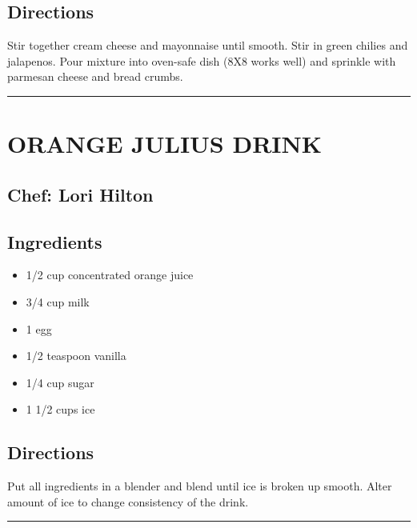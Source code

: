 \documentclass[
]{book}
\providecommand{\tightlist}{%
  \setlength{\itemsep}{0pt}\setlength{\parskip}{0pt}}
\begin{document}
\hypertarget{directions-8}{%
\subsection*{Directions}\label{directions-8}}


Stir together cream cheese and mayonnaise until smooth. Stir in green chilies and jalapenos. Pour mixture into oven-safe dish (8X8 works well) and sprinkle with parmesan cheese and bread crumbs.

\begin{center}\rule{0.5\linewidth}{0.5pt}\end{center}

\hypertarget{orange-julius-drink}{%
\section*{ORANGE JULIUS DRINK}\label{orange-julius-drink}}


\hypertarget{chef-lori-hilton}{%
\subsection*{Chef: Lori Hilton}\label{chef-lori-hilton}}


\hypertarget{ingredients-9}{%
\subsection*{Ingredients}\label{ingredients-9}}


\begin{itemize}
\tightlist
\item
  1/2 cup concentrated orange juice
\item
  3/4 cup milk
\item
  1 egg
\item
  1/2 teaspoon vanilla
\item
  1/4 cup sugar
\item
  1 1/2 cups ice
\end{itemize}

\hypertarget{directions-9}{%
\subsection*{Directions}\label{directions-9}}


Put all ingredients in a blender and blend until ice is broken up smooth.
Alter amount of ice to change consistency of the drink.

\begin{center}\rule{0.5\linewidth}{0.5pt}\end{center}
\end{document}
